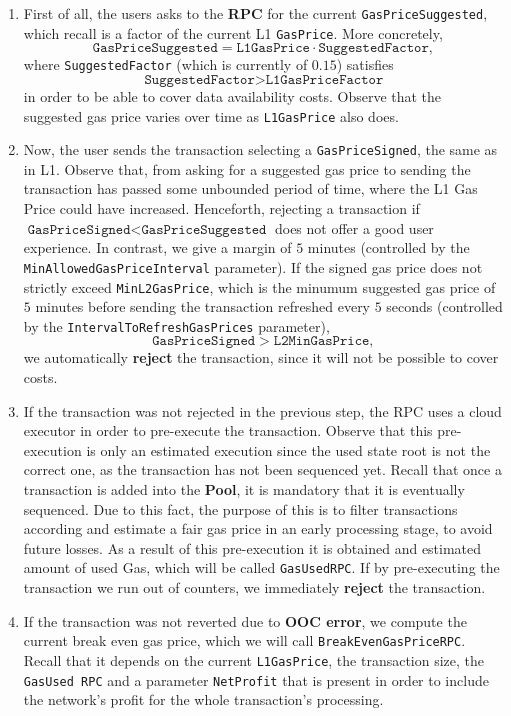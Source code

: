 \begin{enumerate}

\item First of all, the users asks to the \textbf{RPC} for the current \texttt{GasPriceSuggested}, which recall is a factor of the current L1 \texttt{GasPrice}. More concretely,
\[
\texttt{GasPriceSuggested} = \texttt{L1GasPrice} \cdot \texttt{SuggestedFactor},
\]
where \texttt{SuggestedFactor} (which is currently of $0.15$) satisfies
\[
\texttt{SuggestedFactor} > \texttt{L1GasPriceFactor}
\]
in order to be able to cover data availability costs. Observe that the suggested gas price varies over time as \texttt{L1GasPrice} also does.

\item Now, the user sends the transaction selecting a \texttt{GasPriceSigned}, the same as in L1. Observe that, from asking for a suggested gas price to sending the transaction has passed some unbounded period of time, where the L1 Gas Price could have increased. Henceforth, rejecting a transaction if $\texttt{GasPriceSigned} < \texttt{GasPriceSuggested}$ does not offer a good user experience. In contrast, we give a margin of $5$ minutes (controlled by the \texttt{MinAllowedGasPriceInterval} parameter). If the signed gas price does not strictly exceed \texttt{MinL2GasPrice}, which is the minumum suggested gas price of $5$ minutes before sending the transaction refreshed every $5$ seconds (controlled by the \texttt{IntervalToRefreshGasPrices} parameter),
\[
\texttt{GasPriceSigned} > \texttt{L2MinGasPrice},
\]
we automatically \textbf{reject} the transaction, since it will not be possible to cover costs.

\item If the transaction was not rejected in the previous step, the RPC uses a cloud executor in order to pre-execute the transaction. Observe that this pre-execution is only an estimated execution since the used state root is not the correct one, as the transaction has not been sequenced yet. Recall that once a transaction is added into the \textbf{Pool}, it is mandatory that it is eventually sequenced. Due to this fact, the purpose of this is to filter transactions according and estimate a fair gas price in an early processing stage, to avoid future losses. As a result of this pre-execution it is obtained and estimated amount of used Gas, which will be called \texttt{GasUsedRPC}. If by pre-executing the transaction we run out of counters, we immediately \textbf{reject} the transaction.

\item If the transaction was not reverted due to \textbf{OOC error}, we compute the current break even gas price, which we will call \texttt{BreakEvenGasPriceRPC}. Recall that it depends on the current \texttt{L1GasPrice}, the transaction size, the \texttt{GasUsed RPC} and a parameter \texttt{NetProfit} that is present in order to include the network's profit for the whole transaction's processing.


\end{enumerate}
